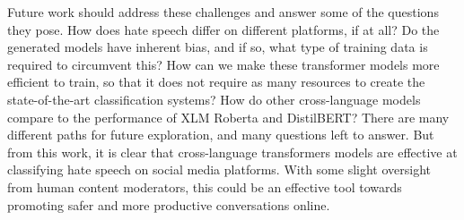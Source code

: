 \documentclass{article}
\begin{document}
Future work should address these challenges and answer some of the questions they pose. How does hate speech differ on different platforms, if at all? Do the generated models have inherent bias, and if so, what type of training data is required to circumvent this? How can we make these transformer models more efficient to train, so that it does not require as many resources to create the state-of-the-art classification systems? How do other cross-language models compare to the performance of XLM Roberta and DistilBERT? There are many different paths for future exploration, and many questions left to answer. But from this work, it is clear that cross-language transformers models are effective at classifying hate speech on social media platforms. With some slight oversight from human content moderators, this could be an effective tool towards promoting safer and more productive conversations online.

\begin{footnotesize}


\end{footnotesize}
\end{document}
